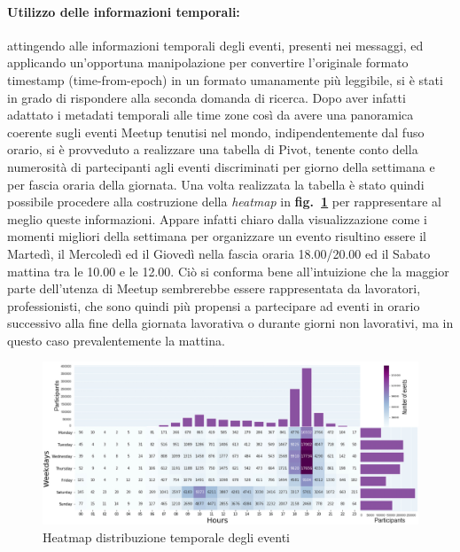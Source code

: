 \documentclass[fleqn,10pt]{SelfArx} %
\begin{document}
{\paragraph{Utilizzo delle informazioni temporali:}
attingendo alle informazioni temporali degli eventi, presenti nei messaggi, ed applicando un'opportuna manipolazione per convertire l'originale formato timestamp (time-from-epoch) in un formato umanamente più leggibile, si è stati in grado di rispondere alla seconda domanda di ricerca. 
Dopo aver infatti adattato i metadati temporali alle time zone così da avere una panoramica coerente sugli eventi Meetup tenutisi nel mondo, indipendentemente dal fuso orario, si è provveduto a realizzare una tabella di Pivot, tenente conto della numerosità di partecipanti agli eventi discriminati per giorno della settimana e per fascia oraria della giornata. 
Una volta realizzata la tabella è stato quindi possibile procedere alla costruzione della \textit{heatmap} in \textbf{fig.~\ref{plot_heatmap}} 
per rappresentare al meglio queste informazioni. 
Appare infatti chiaro dalla visualizzazione come i momenti migliori della settimana per organizzare un evento risultino essere il Martedì, il Mercoledì ed il Giovedì nella fascia oraria 18.00/20.00 ed il Sabato mattina tra le 10.00 e le 12.00. 
Ciò si conforma bene all'intuizione che la maggior parte dell'utenza di Meetup sembrerebbe essere rappresentata da lavoratori, professionisti, che sono quindi più propensi a partecipare ad eventi in orario successivo alla fine della giornata lavorativa o durante giorni non lavorativi, ma in questo caso prevalentemente la mattina.
\begin{figure}
\centering
\includegraphics[width = 9.2 cm, height = 5 cm]{heatmap_with_barplot_v3.jpg}
\vspace*{0.01cm}
\caption{\footnotesize \label{plot_heatmap} Heatmap distribuzione temporale degli eventi}
\end{figure}
}
\end{document}
